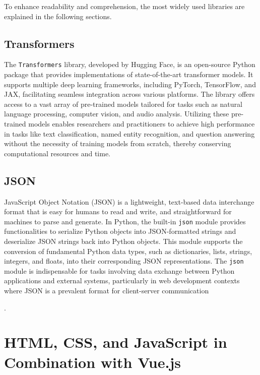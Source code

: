To enhance readability and comprehension, the most widely used libraries are explained in the following sections.

\subsection{Transformers}

The \texttt{Transformers} library, developed by Hugging Face, is an open-source Python package that provides implementations of state-of-the-art transformer models. 
It supports multiple deep learning frameworks, including PyTorch, TensorFlow, and JAX, facilitating seamless integration across various platforms. 
The library offers access to a vast array of pre-trained models tailored for tasks such as natural language processing, computer vision, 
and audio analysis. Utilizing these pre-trained models enables researchers and practitioners to achieve high performance in tasks like text classification, 
named entity recognition, and question answering without the necessity of training models from scratch, thereby conserving computational resources and time.

\cite{transformers}

\subsection{JSON}

JavaScript Object Notation (JSON) is a lightweight, text-based data interchange format that is easy for humans to read and write, and straightforward for machines to parse and generate. In Python, the built-in \texttt{json} module provides functionalities to serialize Python objects into JSON-formatted strings and deserialize JSON strings back into Python objects. This module supports the conversion of fundamental Python data types, such as dictionaries, lists, strings, integers, and floats, into their corresponding JSON representations. The \texttt{json} module is indispensable for tasks involving data exchange between Python applications and external systems, particularly in web development contexts where JSON is a prevalent format for client-server communication 

\cite{python-json}.


\section{HTML, CSS, and JavaScript in Combination with Vue.js}

